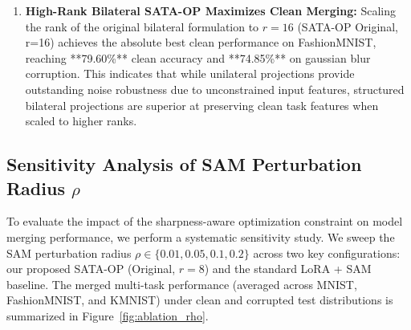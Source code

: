 \documentclass{article}
\theoremstyle{plain}
\theoremstyle{definition}
\theoremstyle{remark}
\begin{document}
\begin{enumerate}
    \item \textbf{High-Rank Bilateral SATA-OP Maximizes Clean Merging:} Scaling the rank of the original bilateral formulation to $r=16$ (SATA-OP Original, r=16) achieves the absolute best clean performance on FashionMNIST, reaching **79.60\%** clean accuracy and **74.85\%** on gaussian blur corruption. This indicates that while unilateral projections provide outstanding noise robustness due to unconstrained input features, structured bilateral projections are superior at preserving clean task features when scaled to higher ranks.
\end{enumerate}

\subsection{Sensitivity Analysis of SAM Perturbation Radius $\rho$}

To evaluate the impact of the sharpness-aware optimization constraint on model merging performance, we perform a systematic sensitivity study. We sweep the SAM perturbation radius $\rho \in \{0.01, 0.05, 0.1, 0.2\}$ across two key configurations: our proposed SATA-OP (Original, $r=8$) and the standard LoRA + SAM baseline. The merged multi-task performance (averaged across MNIST, FashionMNIST, and KMNIST) under clean and corrupted test distributions is summarized in Figure~\ref{fig:ablation_rho}.
\end{document}
